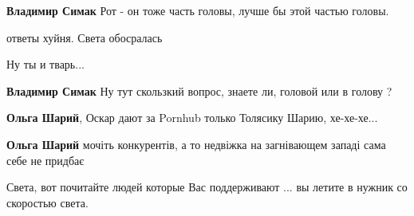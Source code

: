 \begin{itemize}
\begin{itemize}
\textbf{Владимир Симак} Рот - он тоже часть головы, лучше бы этой частью головы.

 
ответы хуйня. Света обосралась

 
Ну ты и тварь...

 
\textbf{Владимир Симак} Ну тут скользкий вопрос, знаете ли, головой или в голову ?

 
\textbf{Ольга Шарий}, Оскар дают за Pornhub только Толясику Шарию, хе-хе-хе...

 
\textbf{Ольга Шарий} мочіть конкурентів, а то недвіжка на загнівающем западі сама себе не придбає

 
Света, вот почитайте людей которые Вас поддерживают ... вы летите в нужник со скоростью света.

 

\end{itemize}
\end{itemize}

